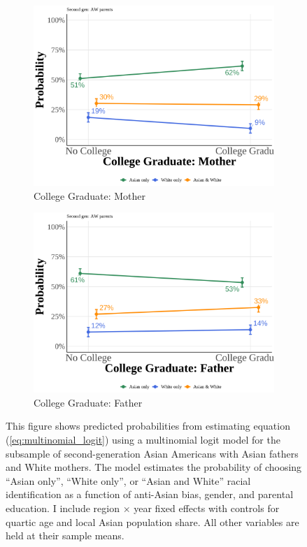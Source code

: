 \begin{center}
\begin{figure}[!htb]
\vspace{0.5cm}

\begin{subfigure}{.48\textwidth}
\caption{College Graduate: Mother}
\centering
\includegraphics[width=1\linewidth]{simple_pp_MomGradCollege_second_aw.png}
\end{subfigure}
\hfill
\begin{subfigure}{.48\textwidth}
\caption{College Graduate: Father}
\centering
\includegraphics[width=1\linewidth]{simple_pp_DadGradCollege_second_aw.png}
\end{subfigure}

\caption*{\footnotesize{This figure shows predicted probabilities from estimating equation (\ref{eq:multinomial_logit}) using a multinomial logit model for the subsample of second-generation Asian Americans with Asian fathers and White mothers. The model estimates the probability of choosing ``Asian only'', ``White only'', or ``Asian and White'' racial identification as a function of anti-Asian bias, gender, and parental education. I include region $\times$ year fixed effects with controls for quartic age and local Asian population share. All other variables are held at their sample means.}}
\end{figure}
\end{center}

